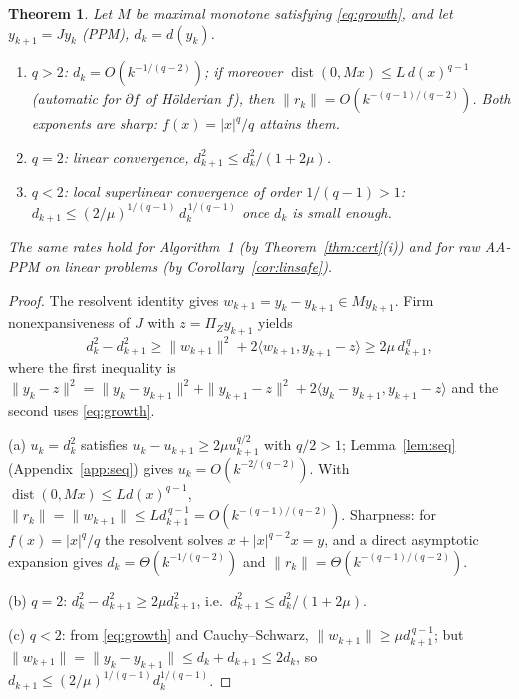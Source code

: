\documentclass[10pt,a4paper]{amsart}
\newtheorem{theorem}{Theorem}
\newcommand{\abs}[1]{| #1 |}
\DeclareMathOperator{\dist}{dist}
\newcommand{\inner}[2]{\langle #1, #2 \rangle}
\newcommand{\norm}[1]{\| #1 \|}
\begin{document}
\begin{theorem}\label{thm:growth}
Let $M$ be maximal monotone satisfying \eqref{eq:growth}, and let
$y_{k+1}=Jy_k$ (PPM), $d_k=d(y_k)$.
\begin{enumerate}[label=(\alph*)]
\item $q>2$: $d_k=O(k^{-1/(q-2)})$; if moreover
      $\dist(0,Mx)\le L\,d(x)^{q-1}$ (automatic for $\partial f$ of
      H\"olderian $f$), then
      $\norm{r_k}=O(k^{-(q-1)/(q-2)})$. Both exponents are sharp:
      $f(x)=\abs{x}^q/q$ attains them.
\item $q=2$: linear convergence,
      $d_{k+1}^2\le d_k^2/(1+2\mu)$.
\item $q<2$: local superlinear convergence of order $1/(q-1)>1$:
      $d_{k+1}\le (2/\mu)^{1/(q-1)}\,d_k^{\,1/(q-1)}$ once
      $d_k$ is small enough.
\end{enumerate}
The same rates hold for Algorithm~1 (by Theorem~\ref{thm:cert}(i)) and for
raw AA-PPM on linear problems (by Corollary~\ref{cor:linsafe}).
\end{theorem}

\begin{proof}
The resolvent identity gives $w_{k+1}=y_k-y_{k+1}\in My_{k+1}$. Firm
nonexpansiveness of $J$ with $z=\Pi_Zy_{k+1}$ yields
\[
d_k^2-d_{k+1}^2
\ge \norm{w_{k+1}}^2+2\inner{w_{k+1}}{y_{k+1}-z}
\ge 2\mu\, d_{k+1}^{\,q},
\]
where the first inequality is
$\norm{y_k-z}^2=\norm{y_k-y_{k+1}}^2+\norm{y_{k+1}-z}^2
+2\inner{y_k-y_{k+1}}{y_{k+1}-z}$ and the second uses \eqref{eq:growth}.

(a) $u_k=d_k^2$ satisfies $u_k-u_{k+1}\ge 2\mu u_{k+1}^{q/2}$ with
$q/2>1$; Lemma~\ref{lem:seq} (Appendix~\ref{app:seq}) gives
$u_k=O(k^{-2/(q-2)})$. With $\dist(0,Mx)\le Ld(x)^{q-1}$,
$\norm{r_k}=\norm{w_{k+1}}\le L d_{k+1}^{\,q-1}=O(k^{-(q-1)/(q-2)})$.
Sharpness: for $f(x)=\abs{x}^q/q$ the resolvent solves
$x+\abs{x}^{q-2}x=y$, and a direct asymptotic expansion gives
$d_k=\Theta(k^{-1/(q-2)})$ and $\norm{r_k}=\Theta(k^{-(q-1)/(q-2)})$.

(b) $q=2$: $d_k^2-d_{k+1}^2\ge2\mu d_{k+1}^2$, i.e.\
$d_{k+1}^2\le d_k^2/(1+2\mu)$.

(c) $q<2$: from \eqref{eq:growth} and Cauchy--Schwarz,
$\norm{w_{k+1}}\ge\mu d_{k+1}^{\,q-1}$; but
$\norm{w_{k+1}}=\norm{y_k-y_{k+1}}\le d_k+d_{k+1}\le 2d_k$, so
$d_{k+1}\le(2/\mu)^{1/(q-1)}d_k^{1/(q-1)}$.
\end{proof}
\end{document}
